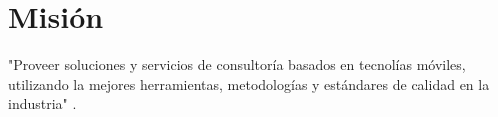 \section{Misión} \label{Mision}

"Proveer soluciones y servicios de consultoría basados en tecnolías móviles, utilizando la mejores herramientas, metodologías y estándares de calidad en la industria" \cite{DIG1}.